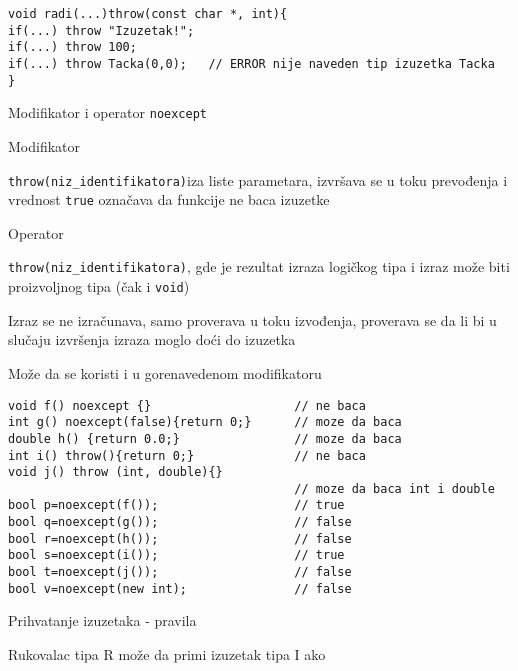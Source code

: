 \documentclass{article}
\newenvironment{xitemize}{%
    
    \itemize
    \larger
}{%
    \enditemize
}
\let\olditemize\itemize
\let\endolditemize\enditemize
\renewenvironment{itemize}{%
    \smaller
    \olditemize
}{%
    \endolditemize
}
\providecommand{\inlinecode}[1]{\texttt{#1}}
\begin{document}
\begin{xitemize}
\begin{itemize}
\begin{lstlisting}
void radi(...)throw(const char *, int){
if(...) throw "Izuzetak!";
if(...) throw 100;
if(...) throw Tacka(0,0);   // ERROR nije naveden tip izuzetka Tacka
}
\end{lstlisting}
\end{itemize} 
\item Modifikator i operator \inlinecode{noexcept}
\begin{itemize}
    \item Modifikator
    \begin{itemize}
        \item[\textperiodcentered]\inlinecode{throw(niz\_identifikatora)}iza liste parametara, izvršava se u toku prevođenja i vrednost \inlinecode{true} označava da funkcije ne baca izuzetke
    \end{itemize}
    \item Operator
    \begin{itemize}
        \item \inlinecode{throw(niz\_identifikatora)}, gde je rezultat izraza logičkog tipa i izraz može biti proizvoljnog tipa (čak i \inlinecode{void})
        \item Izraz se ne izračunava, samo proverava u toku izvođenja, proverava se da li bi u slučaju izvršenja izraza moglo doći do izuzetka
        \item Može da se koristi i u gorenavedenom modifikatoru
    \end{itemize}
    \begin{lstlisting}
void f() noexcept {}                    // ne baca
int g() noexcept(false){return 0;}      // moze da baca
double h() {return 0.0;}                // moze da baca
int i() throw(){return 0;}              // ne baca
void j() throw (int, double){}
                                        // moze da baca int i double
bool p=noexcept(f());                   // true
bool q=noexcept(g());                   // false
bool r=noexcept(h());                   // false
bool s=noexcept(i());                   // true
bool t=noexcept(j());                   // false
bool v=noexcept(new int);               // false        
    \end{lstlisting}
\end{itemize}
\item Prihvatanje izuzetaka - pravila
\begin{itemize}
    \item Rukovalac tipa R može da primi izuzetak tipa I ako
    \begin{enumerate}

\end{enumerate}
\end{itemize}
\end{xitemize}
\end{document}
